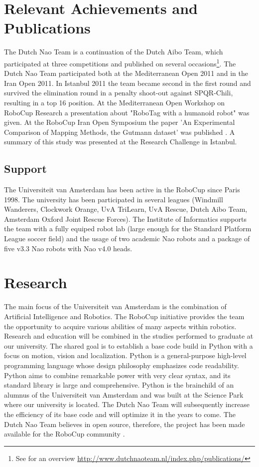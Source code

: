 \documentclass[11pt]{article}
\begin{document}
\section{Relevant Achievements and Publications}
The Dutch Nao Team is a continuation of the Dutch Aibo Team, which participated at three competitions and published on several occasions\footnote{See for an overview \url{http://www.dutchnaoteam.nl/index.php/publications/}}. 
The Dutch Nao Team participated both at the Mediterranean Open 2011 and in the Iran Open 2011.  In Istanbul 2011 the team became second in the first round and survived the elimination round in a penalty shoot-out against SPQR-Chili, resulting in a top 16 position. At the Mediterranean Open Workshop on RoboCup Research a presentation about "RoboTag with a humanoid robot" was given.
At the RoboCup Iran Open Symposium the paper 'An Experimental Comparison of Mapping Methods, the Gutmann dataset' was published \cite{Visser2011rios}. A summary of this study was presented at the Research Challenge in Istanbul.
\subsection*{Support}
The Universiteit van Amsterdam has been active in the RoboCup since Paris 1998. The university has been participated in several leagues (Windmill Wanderers, Clockwork Orange, UvA TriLearn, UvA Rescue, Dutch Aibo Team, Amsterdam Oxford Joint Rescue Forces).
The Institute of Informatics supports the team with a fully equiped robot lab (large enough for the Standard Platform League soccer field) and the usage of two academic Nao robots and a package of five v3.3 Nao robots with Nao v4.0 heads.
\section{Research}
The main focus of the Universiteit van Amsterdam is the combination of Artificial Intelligence and Robotics. The RoboCup initiative provides the team the opportunity to acquire various abilities of many aspects within robotics.
Research and education will be combined in the studies performed to graduate at our university. The shared goal is to establish a base code build in Python with a focus on motion, vision and localization. 
Python is a general-purpose high-level programming language whose design philosophy emphasizes code readability. Python aims to combine remarkable power with very clear syntax, and its standard library is large and comprehensive. 
Python is the brainchild of an alumnus of the Universiteit van Amsterdam and was built at the Science Park where our university is located. 
The Dutch Nao Team will subsequently increase the efficiency of its base code and will optimize it in the years to come. 
The Dutch Nao Team believes in open source, therefore, the project has been made available for the RoboCup community \cite{DutchNaoTeamTechReport2011}.
\end{document}
